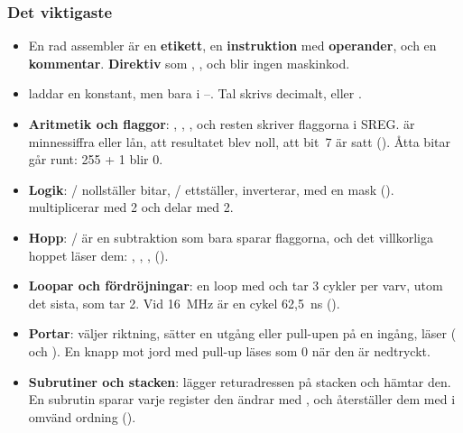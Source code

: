 \subsubsection{Det viktigaste}
\begin{itemize}
  \item En rad assembler är en \textbf{etikett}, en \textbf{instruktion} med \textbf{operander}, och
    en \textbf{kommentar}. \textbf{Direktiv} som , ,  och
     blir ingen maskinkod.
  \item {} laddar en konstant, men bara i --. Tal skrivs decimalt,
     eller .
  \item \textbf{Aritmetik och flaggor}: , , ,  och resten
    skriver flaggorna i SREG.  är minnessiffra eller lån,  att resultatet blev noll,
     att bit~7 är satt (). Åtta bitar går runt: 255 + 1 blir 0.
  \item \textbf{Logik}: / nollställer bitar, / ettställer,
     inverterar, med en mask ().  multiplicerar med 2 och
     delar med 2.
  \item \textbf{Hopp}: / är en subtraktion som bara sparar flaggorna, och det
    villkorliga hoppet läser dem: , , , 
    ().
  \item \textbf{Loopar och fördröjningar}: en loop med  och  tar 3 cykler per
    varv, utom det sista, som tar 2. Vid 16~MHz är en cykel 62,5~ns ().
  \item \textbf{Portar}:  väljer riktning,  sätter en utgång eller pull-upen
    på en ingång,  läser ( och ). En knapp mot jord med
    pull-up läses som 0 när den är nedtryckt.
  \item \textbf{Subrutiner och stacken}:  lägger returadressen på stacken och
     hämtar den. En subrutin sparar varje register den ändrar med , och
    återställer dem med  i omvänd ordning ().
\end{itemize}

